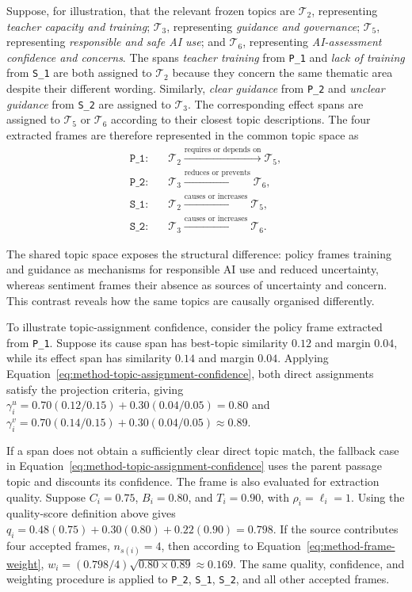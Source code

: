 {Suppose, for illustration, that the relevant frozen topics are $\mathcal{T}_2$,
representing \textit{teacher capacity and training}; $\mathcal{T}_3$, representing
\textit{guidance and governance}; $\mathcal{T}_5$, representing \textit{responsible
and safe AI use}; and $\mathcal{T}_6$, representing \textit{AI-assessment confidence
and concerns}. The spans \textit{teacher training} from \texttt{P\_1} and
\textit{lack of training} from \texttt{S\_1} are both assigned to $\mathcal{T}_2$
because they concern the same thematic area despite their different wording.
Similarly, \textit{clear guidance} from \texttt{P\_2} and \textit{unclear guidance}
from \texttt{S\_2} are assigned to $\mathcal{T}_3$. The corresponding effect spans
are assigned to $\mathcal{T}_5$ or $\mathcal{T}_6$ according to their closest topic
descriptions. The four extracted frames are therefore represented in the common topic
space as
\[
\begin{aligned}
\texttt{P\_1}:&\quad
\mathcal{T}_2
\xrightarrow{\text{requires or depends on}}
\mathcal{T}_5,\\
\texttt{P\_2}:&\quad
\mathcal{T}_3
\xrightarrow{\text{reduces or prevents}}
\mathcal{T}_6,\\
\texttt{S\_1}:&\quad
\mathcal{T}_2
\xrightarrow{\text{causes or increases}}
\mathcal{T}_5,\\
\texttt{S\_2}:&\quad
\mathcal{T}_3
\xrightarrow{\text{causes or increases}}
\mathcal{T}_6.
\end{aligned}
\]

The shared topic space exposes the structural difference: policy frames training and
guidance as mechanisms for responsible AI use and reduced uncertainty, whereas
sentiment frames their absence as sources of uncertainty and concern. This contrast
reveals how the same topics are causally organised differently.

To illustrate topic-assignment confidence, consider the policy frame extracted from
\texttt{P\_1}. Suppose its cause span has best-topic similarity $0.12$ and margin
$0.04$, while its effect span has similarity $0.14$ and margin $0.04$. Applying
Equation~\ref{eq:method-topic-assignment-confidence}, both direct assignments satisfy
the projection criteria, giving
$\gamma_i^{u}
=
0.70(0.12/0.15)+0.30(0.04/0.05)
=
0.80$
and
$\gamma_i^{v}
=
0.70(0.14/0.15)+0.30(0.04/0.05)
\approx
0.89$.

If a span does not obtain a sufficiently clear direct topic match, the fallback case
in Equation~\ref{eq:method-topic-assignment-confidence} uses the parent passage topic
and discounts its confidence. The frame is also evaluated for extraction quality.
Suppose $C_i=0.75$, $B_i=0.80$, and $T_i=0.90$, with $\rho_i=\ell_i=1$. Using the
quality-score definition above gives $q_i=0.48(0.75)+0.30(0.80)+0.22(0.90)=0.798$. If
the source contributes four accepted frames, $n_{s(i)}=4$, then according to
Equation~\ref{eq:method-frame-weight},
$w_i=(0.798/4)\sqrt{0.80\times0.89}\approx0.169$. The same quality, confidence, and
weighting procedure is applied to \texttt{P\_2}, \texttt{S\_1}, \texttt{S\_2}, and
all other accepted frames.

}
